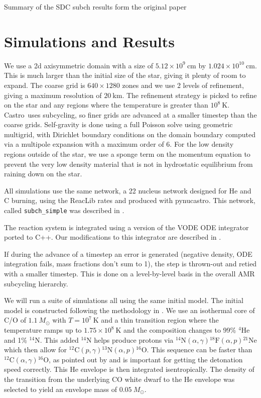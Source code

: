 \documentclass[linenumbers,trackchanges]{aastex631}
\newcommand{\isot}[2]{$^{#2}\mathrm{#1}$}
\newcommand{\isotm}[2]{{}^{#2}\mathrm{#1}}
\newcommand{\castro}{{\sf Castro}}
\newcommand{\pynucastro}{{\sf pynucastro}}
\begin{document}
Summary of the SDC subch results form the original paper

\section{Simulations and Results}\label{Sec:results}


We use a 2d axisymmetric domain with a size of $5.12\times 10^9~\mathrm{cm}$ by $1.024\times 10^{10}~\mathrm{cm}$.  This is
much larger than the initial size of the star, giving it plenty of
room to expand.  The coarse grid is $640\times 1280$ zones and we use
2 levels of refinement, giving a maximum resolution of
$20~\mathrm{km}$.  The refinement strategy is picked to refine on the
star and any regions where the temperature is greater than
$10^8~\mathrm{K}$.  \castro\ uses subcycling, so finer grids are
advanced at a smaller timestep than the coarse grids.  Self-gravity is
done using a full Poisson solve using geometric multigrid, with
Dirichlet boundary conditions on the domain boundary computed via a
multipole expansion with a maximum order of 6.  For the low density
regions outside of the star, we use a sponge term on the momentum
equation to prevent the very low density material that is not in
hydrostatic equilibrium from raining down on the star.

All simulations use the same network, a 22 nucleus network designed for
He and C burning, using the ReacLib rates \cite{reaclib} and produced with
\pynucastro \citep{pynucastro2}.  This network, called {\tt subch\_simple} was
described in \cite{zhi2023}.

The reaction system is integrated using a version of the VODE ODE integrator
\citep{vode} ported to C++.  Our modifications to this integrator are described
in \citet{castro_simple_sdc}.

If during the advance of a timestep an error is generated (negative
density, ODE integration fails, mass fractions don't sum to 1), the
step is thrown-out and retied with a smaller timestep.  This is done
on a level-by-level basis in the overall AMR subcycling hierarchy.

We will run a suite of simulations all using the same initial model.
The initial model is constructed following the methodology in
\citet{subchandra}.  We use an isothermal core of C/O of $1.1~M_\odot$
with $T = 10^7~\mathrm{K}$ and a thin transition region where the
temperature ramps up to $1.75\times 10^8~\mathrm{K}$ and the
composition changes to 99\% \isot{He}{4} and 1\% \isot{N}{14}.  This
added \isot{N}{14} helps produce protons via
$\isotm{N}{14}(\alpha,\gamma)\isotm{F}{18}(\alpha,p)\isotm{Ne}{21}$
which then allow for
$\isotm{C}{12}(p,\gamma)\isotm{N}{13}(\alpha,p)\isotm{O}{16}$.  This
sequence can be faster than
$\isotm{C}{12}(\alpha,\gamma)\isotm{O}{16}$, as pointed out by
\citet{shenbildsten} and is important for getting the detonation speed
correctly.  This He envelope is then integrated isentropically.  The
density of the transition from the underlying CO white dwarf to the He
envelope was selected to yield an envelope mass of $0.05~M_\odot$.
\end{document}
